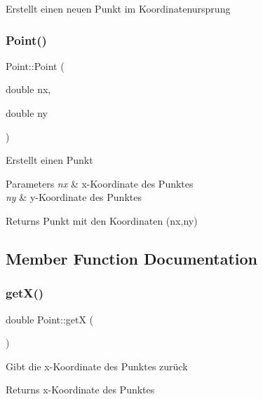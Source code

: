 Erstellt einen neuen Punkt im Koordinatenursprung \mbox{\label{class_point_ac48df7076af6d62f06c83dec7210af6f}} 
\subsubsection{\texorpdfstring{Point()}{Point()}\hspace{0.1cm}{\footnotesize\ttfamily [2/2]}}
{\footnotesize\ttfamily Point\+::\+Point (\begin{DoxyParamCaption}\item[{double}]{nx,  }\item[{double}]{ny }\end{DoxyParamCaption})}

Erstellt einen Punkt 
\begin{DoxyParams}{Parameters}
{\em nx} & x-\/\+Koordinate des Punktes \\
\hline
{\em ny} & y-\/\+Koordinate des Punktes \\
\hline
\end{DoxyParams}
\begin{DoxyReturn}{Returns}
Punkt mit den Koordinaten (nx,ny) 
\end{DoxyReturn}


\subsection{Member Function Documentation}
\mbox{\label{class_point_a8de35a6098cdd7267b4167776da83da6}} 
\subsubsection{\texorpdfstring{get\+X()}{getX()}}
{\footnotesize\ttfamily double Point\+::getX (\begin{DoxyParamCaption}{ }\end{DoxyParamCaption})}

Gibt die x-\/\+Koordinate des Punktes zurück \begin{DoxyReturn}{Returns}
x-\/\+Koordinate des Punktes 
\end{DoxyReturn}
\mbox{\label{class_point_aa278c8bcb8aeb4101023a4baf473b547}} 

